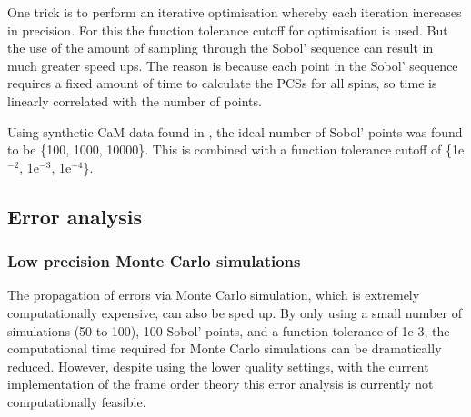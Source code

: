 One trick is to perform an iterative optimisation whereby each iteration increases in precision.
For this the function tolerance cutoff for optimisation is used.
But the use of the amount of sampling through the Sobol' sequence can result in much greater speed ups.
The reason is because each point in the Sobol' sequence requires a fixed amount of time to calculate the PCSs for all spins, so time is linearly correlated with the number of points.

Using synthetic CaM data found in , the ideal number of Sobol' points was found to be \{100, 1000, 10000\}.
This is combined with a function tolerance cutoff of \{1e$^{-2}$, 1e$^{-3}$, 1e$^{-4}$\}.





\subsection{Error analysis}






\subsubsection{Low precision Monte Carlo simulations}

The propagation of errors via Monte Carlo simulation, which is extremely computationally expensive, can also be sped up.
By only using a small number of simulations (50 to 100), 100 Sobol' points, and a function tolerance of 1e-3, the computational time required for Monte Carlo simulations can be dramatically reduced.
However, despite using the lower quality settings, with the current implementation of the frame order theory this error analysis is currently not computationally feasible.

